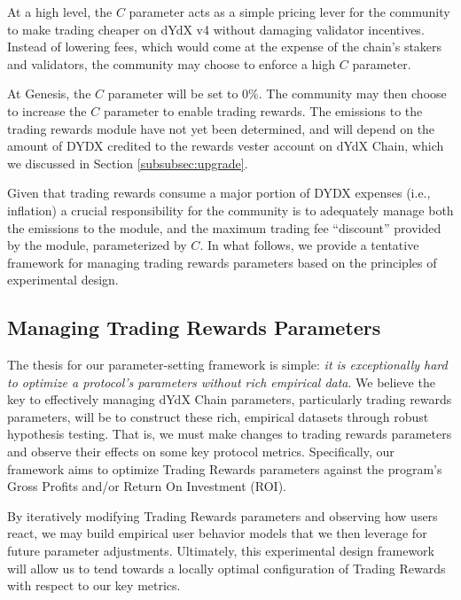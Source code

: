         At a high level, the $C$ parameter acts as a simple pricing lever for the community to make trading cheaper on dYdX v4 without damaging validator incentives. Instead of lowering fees, which would come at the expense of the chain's stakers and validators, the community may choose to enforce a high $C$ parameter. 

        At Genesis, the $C$ parameter will be set to $0\%$. The community may then choose to increase the $C$ parameter to enable trading rewards. The emissions to the trading rewards module have not yet been determined, and will depend on the amount of DYDX credited to the rewards vester account on dYdX Chain, which we discussed in Section \ref{subsubsec:upgrade}.

        Given that trading rewards consume a major portion of DYDX expenses (i.e., inflation) a crucial responsibility for the community is to adequately manage both the emissions to the module, and the maximum trading fee ``discount'' provided by the module, parameterized by $C$. In what follows, we provide a tentative framework for managing trading rewards parameters based on the principles of experimental design.
        
    \subsection{Managing Trading Rewards Parameters}
    
        The thesis for our parameter-setting framework is simple: \textit{it is exceptionally hard to optimize a protocol’s parameters without rich empirical data}. We believe the key to effectively managing dYdX Chain parameters, particularly trading rewards parameters, will be to construct these rich, empirical datasets through robust hypothesis testing. That is, we must make changes to trading rewards parameters and observe their effects on some key protocol metrics. Specifically, our framework aims to optimize Trading Rewards parameters against the program’s Gross Profits and/or Return On Investment (ROI).
        
        By iteratively modifying Trading Rewards parameters and observing how users react, we may build empirical user behavior models that we then leverage for future parameter adjustments. Ultimately, this experimental design framework will allow us to tend towards a locally optimal configuration of Trading Rewards with respect to our key metrics.

